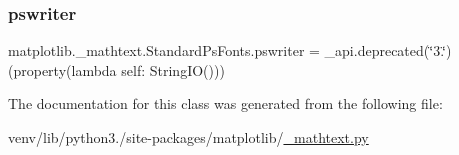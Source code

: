 \subsubsection{\texorpdfstring{pswriter}{pswriter}}
{\footnotesize\ttfamily matplotlib.\+\_\+mathtext.\+Standard\+Ps\+Fonts.\+pswriter = \+\_\+api.\+deprecated(\char`\"{}3.\char`\"{})(property(lambda self\+: String\+IO()))\hspace{0.3cm}{\ttfamily [static]}}



The documentation for this class was generated from the following file\+:\begin{DoxyCompactItemize}
\item 
venv/lib/python3./site-\/packages/matplotlib/\hyperlink{__mathtext_8py}{\+\_\+mathtext.\+py}\end{DoxyCompactItemize}
